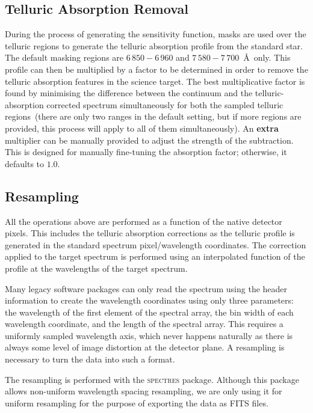 \documentclass[linenumbers, twocolumn]{aastex631}
\begin{document}
\subsection{Telluric Absorption Removal}
During the process of generating the sensitivity function, masks are used
over the telluric regions to generate the telluric absorption
profile from the standard star. The default masking regions are $6\,850-6\,960$
and $7\,580-7\,700$\ \AA\ only. This profile can then be multiplied
by a factor to be determined in order to remove the telluric absorption
features in the science target. The best multiplicative factor is found
by minimising the difference between the continuum and the telluric-absorption
corrected spectrum simultaneously for both the sampled telluric regions~(there are only two ranges in the default setting, but if more regions are
provided, this process will apply to all of them simultaneously).
An \textbf{extra} multiplier can be manually provided to adjust the
strength of the subtraction. This is designed for manually fine-tuning the
absorption factor; otherwise, it defaults to $1.0$.

\subsection{Resampling}
All the operations above are performed as a function of the native detector
pixels. This includes the telluric absorption corrections as the telluric profile
is generated in the standard spectrum pixel/wavelength coordinates. The
correction applied to the target spectrum is performed using an interpolated
function of the profile at the wavelengths of the target spectrum. 

Many legacy
software packages can only read the spectrum using the header information to create
the wavelength coordinates using only three parameters: the wavelength of the
first element of the spectral array, the bin width of each wavelength
coordinate, and the length of the spectral array. This requires a uniformly
sampled wavelength axis, which never happens naturally as there is always some
level of image distortion at the detector plane. A resampling is necessary
to turn the data into such a format.

The resampling is performed with the \textsc{spectres} package. Although
this package allows non-uniform wavelength spacing resampling, we are only
using it for uniform resampling for the purpose of exporting the data as FITS
files.
\end{document}
